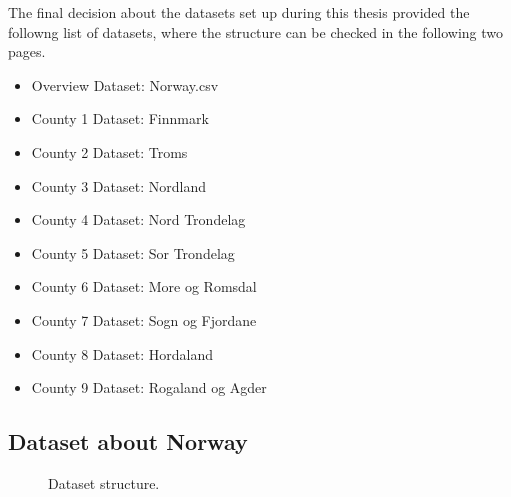 The final decision about the datasets set up during this thesis provided the followng list of datasets, where the structure can be checked in the following two pages.
\vspace{-2mm}
 \setlength{\itemsep}{-5pt}
\begin{itemize}
\item Overview Dataset: Norway.csv
\vspace{-2mm}
\item County 1 Dataset: Finnmark
\vspace{-2mm}
\item County 2 Dataset: Troms
\vspace{-2mm}
\item County 3 Dataset: Nordland
\vspace{-2mm}
\item County 4 Dataset: Nord Trondelag
\vspace{-2mm}
\item County 5 Dataset: Sor Trondelag
\vspace{-2mm}
\item County 6 Dataset: More og Romsdal
\vspace{-2mm}
\item County 7 Dataset: Sogn og Fjordane
\vspace{-2mm}
\item County 8 Dataset: Hordaland
\vspace{-2mm}
\item County 9 Dataset: Rogaland og Agder
\end{itemize}

\newpage

\subsection{Dataset about Norway}

\begin{figure}[H]
    \caption{Dataset structure.}
\end{figure}

